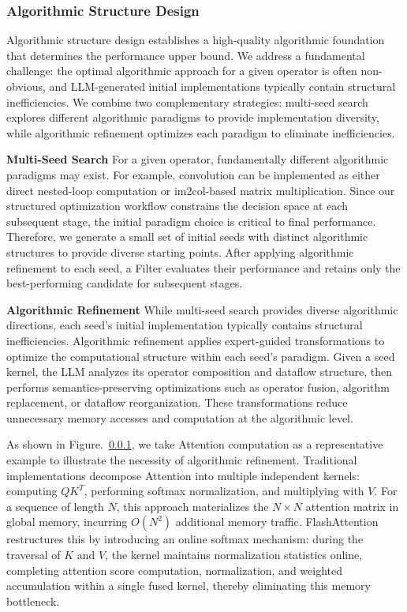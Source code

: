 \documentclass{article}
\theoremstyle{plain}
\theoremstyle{definition}
\theoremstyle{remark}
\begin{document}
\subsubsection{Algorithmic Structure Design}
Algorithmic structure design establishes a high-quality algorithmic foundation that determines the performance upper bound. We address a fundamental challenge: the optimal algorithmic approach for a given operator is often non-obvious, and LLM-generated initial implementations typically contain structural inefficiencies. We combine two complementary strategies: multi-seed search explores different algorithmic paradigms to provide implementation diversity, while algorithmic refinement optimizes each paradigm to eliminate inefficiencies.

\textbf{Multi-Seed Search}
For a given operator, fundamentally different algorithmic paradigms may exist. For example, convolution can be implemented as either direct nested-loop computation or im2col-based matrix multiplication. Since our structured optimization workflow constrains the decision space at each subsequent stage, the initial paradigm choice is critical to final performance. Therefore, we generate a small set of initial seeds with distinct algorithmic structures to provide diverse starting points. After applying algorithmic refinement to each seed, a Filter evaluates their performance and retains only the best-performing candidate for subsequent stages.

\textbf{Algorithmic Refinement}
While multi-seed search provides diverse algorithmic directions, each seed's initial implementation typically contains structural inefficiencies. Algorithmic refinement applies expert-guided transformations to optimize the computational structure within each seed's paradigm. Given a seed kernel, the LLM analyzes its operator composition and dataflow structure, then performs semantics-preserving optimizations such as operator fusion, algorithm replacement, or dataflow reorganization. These transformations reduce unnecessary memory accesses and computation at the algorithmic level.

As shown in Figure.~\ref{}, we take Attention computation as a representative example to illustrate the necessity of algorithmic refinement. Traditional implementations decompose Attention into multiple independent kernels: computing $QK^{T}$, performing softmax normalization, and multiplying with $V$. For a sequence of length $N$, this approach materializes the $N \times N$ attention matrix in global memory, incurring $O(N^2)$ additional memory traffic. FlashAttention restructures this by introducing an online softmax mechanism: during the traversal of $K$ and $V$, the kernel maintains normalization statistics online, completing attention score computation, normalization, and weighted accumulation within a single fused kernel, thereby eliminating this memory bottleneck.
\end{document}
